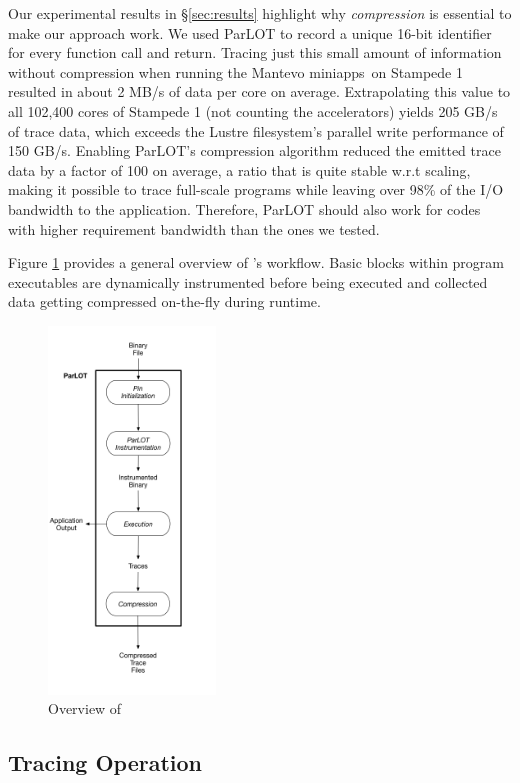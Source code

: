 Our experimental results in \S\ref{sec:results} highlight why \textit{compression} is essential to make our approach work.
%
We used ParLOT to record a unique 16-bit identifier for every function call and return.
%
Tracing just this small amount of information without compression when running the Mantevo miniapps~\cite{mantevo}on Stampede 1 resulted in about 2 MB/s of data per core on average.
%
Extrapolating this value to all 102,400 cores of Stampede 1 (not counting the accelerators) yields 205 GB/s of trace data, which exceeds the Lustre filesystem's parallel write performance of 150 GB/s.
%
Enabling ParLOT's compression algorithm reduced the emitted trace data by a factor of 100 on average, a ratio that is quite stable w.r.t scaling, making it possible to trace full-scale programs while leaving over 98\% of the I/O bandwidth to the application. Therefore, ParLOT should also work for codes with higher requirement bandwidth than the ones we tested.

Figure \ref{overview} provides a general overview of \parlot 's workflow.
%
Basic blocks within program executables are dynamically instrumented before being executed and collected data getting compressed on-the-fly during runtime. 
%

\begin{figure}[!t]
\centering
\includegraphics[width=1.75in]{overview.png}
\caption{Overview of \parlot}
\label{overview}
\end{figure}


\subsection{Tracing Operation}
\label{subsec:traceOp}

